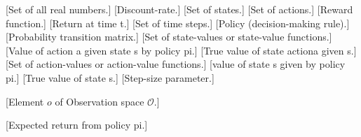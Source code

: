 
[Set of all real numbers.]
[Discount-rate.]
[Set of states.]
[Set of actions.]
[Reward function.]
[Return at time \gls{t}.]
[Set of time steps.]
[Policy (decision-making rule).]
[Probability transition matrix.]
[Set of state-values or state-value functions.]
[Value of action \gls{a} given state \gls{s} by policy \gls{pi}.]
[True value of state action\gls{a} given \gls{s}.]
[Set of action-values or action-value functions.]
[value of state \gls{s} given by policy \gls{pi}.]
[True value of state \gls{s}.]
[Step-size parameter.]

[Element \(o\) of Observation space \(\mathcal{O}\).]

[Expected return from policy \gls{pi}.]
